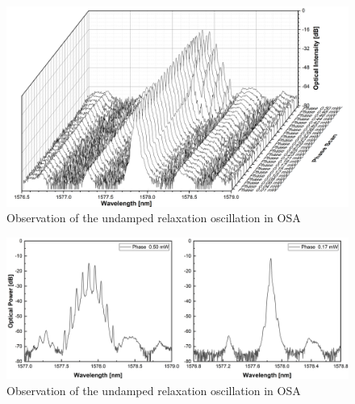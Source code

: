 \begin{figure}[ht]
    \centering
    \includegraphics[width=.9\linewidth]{figures/Undamped_RO_phase_scan_grating_4621.png}
    \caption{Observation of the undamped relaxation oscillation in OSA}
    \label{fig:undamped_RO_phase_scan}
\end{figure}

\begin{figure}[ht]
    \centering
    \includegraphics[width=.8\linewidth]{figures/Undamped_RO_grating_4621.png}
    \caption{Observation of the undamped relaxation oscillation in OSA}
    \label{fig:undamped_RO}
\end{figure}


